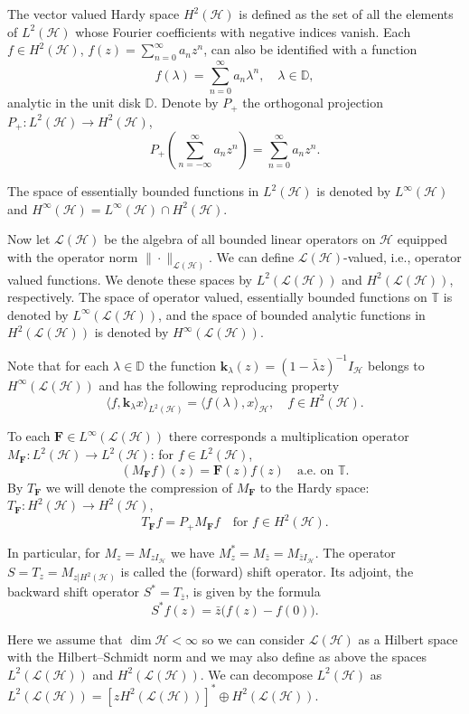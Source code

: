 \documentclass[11pt]{amsart}
\numberwithin{equation}{section}
\newcommand{\hsp}{\mathcal{H}}
\newcommand{\oL }{\mathcal{L}(\hsp) }
\newcommand{\ke}{{\mathbf{k}}}
\newcommand{\F}{{\mathbf{F}}}
\newcommand{\z}{{z}}
\theoremstyle{definition}
\numberwithin{equation}{section}
\begin{document}
The vector valued Hardy space $H^2(\hsp)$ is defined as the set of all the elements of $L^2(\hsp)$ whose Fourier coefficients with negative indices vanish.
Each $f\in H^2(\hsp)$, $\displaystyle f(\z)=\sum_{n=0}^{\infty} a_n \z^n$, can also be identified with a function
$$f(\lambda)=\sum\limits_{n=0}^\infty a_n\lambda^n,\quad \lambda\in\mathbb{D},$$
analytic in the unit disk $\mathbb{D}$. Denote by $P_+$ the orthogonal projection $P_+:L^2(\hsp)\to H^2(\hsp)$,
 $$P_+\left(\sum_{n=-\infty}^{\infty} a_n \z^n\right)=\sum_{n=0}^{\infty} a_n \z^n.$$

 The space of essentially bounded functions in $L^{2}(\hsp)$ is denoted by $L^{\infty}(\hsp)$ and
 $H^{\infty}(\hsp)=L^{\infty}(\hsp)\cap H^{2}(\hsp)$.

Now let $\oL $ be the algebra of all bounded linear operators on $\hsp$ equipped with the operator norm $\|\cdot\|_{\oL}$. We can define $\oL$-valued, i.e., operator valued functions. We denote these spaces by $L^{2}(\oL)$ and $H^{2}(\oL)$, respectively. The space of operator valued, essentially bounded functions on $\mathbb{T}$ is denoted by $L^{\infty}(\oL)$, and the space of bounded analytic functions in $H^{2}(\oL)$ is denoted by $H^{\infty}(\oL)$.


Note that for each $\lambda\in \mathbb{D}$ the function $\ke_\lambda(z)= (1-\bar{\lambda}z)^{-1}I_{\hsp}$ belongs to $H^{\infty}(\oL )$ and has the following reproducing property
$$\langle f, \ke_\lambda x\rangle_{L^2(\hsp)}=\langle f(\lambda),x\rangle_{\hsp}, \quad f\in H^2(\hsp).$$

To each $\F\in L^\infty(\oL)$ there corresponds a multiplication operator $M_\F:L^2(\hsp)\to L^2(\hsp)$: for $f\in L^2(\hsp)$,
$$(M_\F f)(\z)=\F(\z)f(\z)\quad \text{a.e. on }\mathbb{T}.$$
By $T_{\F}$ we will denote the compression of $M_{\F}$ to the Hardy space: $T_{\F}:H^2(\hsp)\to H^2(\hsp)$, $$T_{\F}f=P_+M_{\F}f\quad\text{for }f\in H^2(\hsp).$$

In particular, for $M_z=M_{zI_\hsp}$ we have $M_z^*=M_{\bar{z}}=M_{\bar{z}I_\hsp}$. The operator $S=T_z=M_{z|H^2(\hsp)}$ is called the (forward) shift operator. Its adjoint, the backward shift operator $S^*=T_{\bar z}$, is given by the formula
$$S^*f(z)=\bar z\big(f(z)-f(0)\big).$$

Here we assume that $\dim\hsp<\infty$ so we can consider $\oL $ as a Hilbert space with the Hilbert--Schmidt norm and we may also define as above the spaces $L^2(\oL)$ and $H^2(\oL)$.
We can decompose $L^{2}(\hsp)$ as
$L^2(\oL)=\left[zH^2(\oL)\right]^*\oplus H^2(\oL).$
\end{document}
